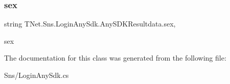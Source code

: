 \subsubsection{\texorpdfstring{sex}{sex}}
{\footnotesize\ttfamily string T\+Net.\+Sns.\+Login\+Any\+Sdk.\+Any\+S\+D\+K\+Resultdata.\+sex\hspace{0.3cm}{\ttfamily [get]}, {\ttfamily [set]}}



sex 



The documentation for this class was generated from the following file\+:\begin{DoxyCompactItemize}
\item 
Sns/Login\+Any\+Sdk.\+cs\end{DoxyCompactItemize}
